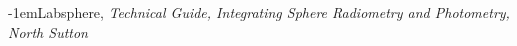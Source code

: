 \def\bibindent{1em}
\renewcommand*{\bibname}{Daftar Pustaka}
\begin{thebibliography}{99}
\makeatletter
\let\old@biblabel\@biblabel
\def\@biblabel#1{\old@biblabel{#1}\kern\bibindent}
\let\old@bibitem\bibitem
\def\bibitem#1{\old@bibitem{#1}\leavevmode\kern-\bibindent}
\makeatother
{}{Labsphere, \emph{Technical Guide, Integrating Sphere Radiometry and Photometry, North Sutton}}
\end{thebibliography}